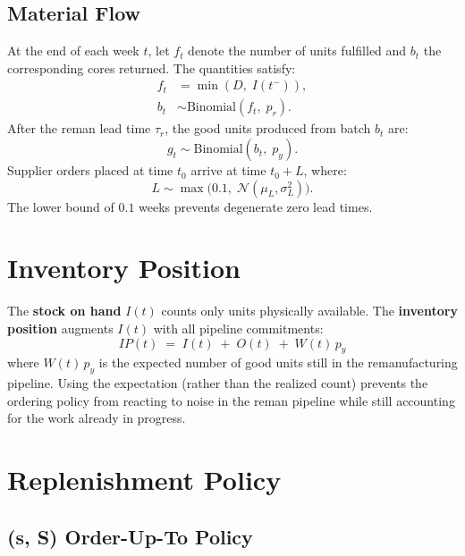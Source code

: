 \documentclass[11pt]{article}
\begin{document}
\subsection{Material Flow}

At the end of each week $t$, let $f_t$ denote the number of units fulfilled and
$b_t$ the corresponding cores returned.  The quantities satisfy:
\begin{align}
  f_t &= \min(D,\; I(t^-)), \\
  b_t &\sim \mathrm{Binomial}(f_t,\; p_r).
\end{align}
After the reman lead time $\tau_r$, the good units produced from batch $b_t$ are:
\begin{equation}
  g_t \sim \mathrm{Binomial}(b_t,\; p_y).
\end{equation}
Supplier orders placed at time $t_0$ arrive at time $t_0 + L$, where:
\begin{equation}
  L \sim \max\!\bigl(0.1,\; \mathcal{N}(\mu_L, \sigma_L^2)\bigr).
\end{equation}
The lower bound of $0.1$ weeks prevents degenerate zero lead times.

\section{Inventory Position}

The \textbf{stock on hand} $I(t)$ counts only units physically available.
The \textbf{inventory position} augments $I(t)$ with all pipeline commitments:
\begin{equation}
  \boxed{IP(t) \;=\; I(t) \;+\; O(t) \;+\; W(t)\,p_y}
  \label{eq:ip}
\end{equation}
where $W(t)\,p_y$ is the expected number of good units still in the
remanufacturing pipeline.  Using the expectation (rather than the realized count)
prevents the ordering policy from reacting to noise in the reman pipeline while
still accounting for the work already in progress.

\section{Replenishment Policy}

\subsection{(s, S) Order-Up-To Policy}
\end{document}
